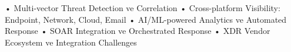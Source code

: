 • Multi-vector Threat Detection ve Correlation
• Cross-platform Visibility: Endpoint, Network, Cloud, Email
• AI/ML-powered Analytics ve Automated Response
• SOAR Integration ve Orchestrated Response
• XDR Vendor Ecosystem ve Integration Challenges